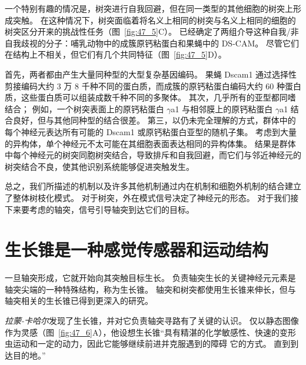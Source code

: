 一个特别有趣的情况是，树突进行自我回避，但在同一类型的其他细胞的树突上形成突触。
在这种情况下，树突面临着将名义上相同的树突与名义上相同的细胞的树突区分开来的挑战性任务（图~\ref{fig:47_5}C）。
已经确定了两组介导这种自我/非自我歧视的分子：哺乳动物中的成簇原钙粘蛋白和果蝇中的 DS-CAM。
尽管它们在结构上不相关，但它们有几个共同特征（图~\ref{fig:47_5}D）。


首先，两者都由产生大量同种型的大型复杂基因编码。
果蝇 Dscam1 通过选择性剪接编码大约 3 万 8 千种不同的蛋白质，而成簇的原钙粘蛋白编码大约 60 种蛋白质，这些蛋白质可以组装成数千种不同的多聚体。
其次，几乎所有的亚型都同嗜结合；
例如，一个树突表面上的原钙粘蛋白 $\gamma$a1 与相邻膜上的原钙粘蛋白 $\gamma$a1 结合良好，但与其他同种型的结合很差。
第三，以仍未完全理解的方式，群体中的每个神经元表达所有可能的 Dscam1 或原钙粘蛋白亚型的随机子集。
考虑到大量的异构体，单个神经元不太可能在其细胞表面表达相同的异构体集。
结果是群体中每个神经元的树突同胞树突结合，导致排斥和自我回避，而它们与邻近神经元的树突结合不良，使其他识别系统能够促进突触发生。


总之，我们所描述的机制以及许多其他机制通过内在机制和细胞外机制的结合建立了整体树枝化模式。
对于树突，外在模式信号决定了神经元的形态。
对于我们接下来要考虑的轴突，信号引导轴突到达它们的目标。



\section{生长锥是一种感觉传感器和运动结构}

一旦轴突形成，它就开始向其突触目标生长。
负责轴突生长的关键神经元元素是轴突尖端的一种特殊结构，称为生长锥。
轴突和树突都使用生长锥来伸长，但与轴突相关的生长锥已得到更深入的研究。


\textit{拉蒙-卡哈尔}发现了生长锥，并对它负责轴突寻路有了关键的认识。
仅以静态图像作为灵感（图~\ref{fig:47_6}A），他设想生长锥“具有精湛的化学敏感性、快速的变形虫运动和一定的动力，因此它能够继续前进并克服遇到的障碍 它的方式。 
直到到达目的地。”


